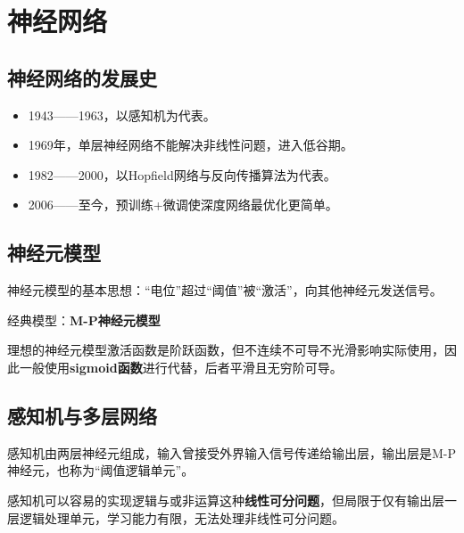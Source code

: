 \chapter{神经网络}
\section{神经网络的发展史}\label{sec:5.1}
\begin{itemize}
    \item 1943——1963，以感知机为代表。
    \item 1969年，单层神经网络不能解决非线性问题，进入低谷期。
    \item 1982——2000，以Hopfield网络与反向传播算法为代表。
    \item 2006——至今，预训练+微调使深度网络最优化更简单。
\end{itemize}
\section{神经元模型}\label{sec:5.2}
神经元模型的基本思想：“电位”超过“阈值”被“激活”，向其他神经元发送信号。

经典模型：\textbf{M-P神经元模型}
\begin{figure}[!htbp]
	\centering
\end{figure}

理想的神经元模型激活函数是阶跃函数，但不连续不可导不光滑影响实际使用，因此一般使用\textbf{sigmoid函数}进行代替，后者平滑且无穷阶可导。

\begin{figure}[!htbp]
	\centering
\end{figure}

\section{感知机与多层网络}\label{sec:5.3}

感知机由两层神经元组成，输入曾接受外界输入信号传递给输出层，输出层是M-P神经元，也称为“阈值逻辑单元”。


感知机可以容易的实现逻辑与或非运算这种\textbf{线性可分问题}，但局限于仅有输出层一层逻辑处理单元，学习能力有限，无法处理非线性可分问题。

